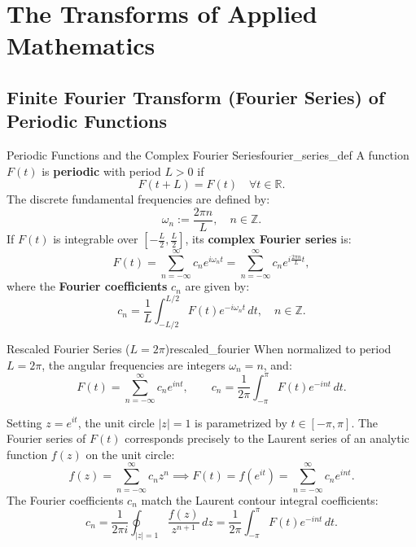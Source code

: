\chapter{The Transforms of Applied Mathematics}

\section{Finite Fourier Transform (Fourier Series) of Periodic Functions}

\begin{definition}{Periodic Functions and the Complex Fourier Series}{fourier_series_def}
A function $F(t)$ is \textbf{periodic} with period $L > 0$ if
\begin{equation}
F(t + L) = F(t) \quad \forall t \in \mathbb{R}.
\end{equation}
The discrete fundamental frequencies are defined by:
\begin{equation}
\omega_n := \frac{2\pi n}{L}, \quad n \in \mathbb{Z}.
\end{equation}
If $F(t)$ is integrable over $\left[-\frac{L}{2}, \frac{L}{2}\right]$, its \textbf{complex Fourier series} is:
\begin{equation}
F(t) = \sum_{n=-\infty}^\infty c_n e^{i \omega_n t} = \sum_{n=-\infty}^\infty c_n e^{i \frac{2\pi n}{L} t},
\end{equation}
where the \textbf{Fourier coefficients} $c_n$ are given by:
\begin{equation}
c_n = \frac{1}{L} \int_{-L/2}^{L/2} F(t) e^{-i \omega_n t}\, dt, \quad n \in \mathbb{Z}.
\end{equation}
\end{definition}

\begin{proposition}{Rescaled Fourier Series ($L = 2\pi$)}{rescaled_fourier}
When normalized to period $L = 2\pi$, the angular frequencies are integers $\omega_n = n$, and:
\begin{equation}
F(t) = \sum_{n=-\infty}^\infty c_n e^{int}, \qquad c_n = \frac{1}{2\pi} \int_{-\pi}^\pi F(t) e^{-int}\, dt.
\end{equation}
\end{proposition}

\begin{remark}
Setting $z = e^{it}$, the unit circle $|z| = 1$ is parametrized by $t \in [-\pi, \pi]$. The Fourier series of $F(t)$ corresponds precisely to the Laurent series of an analytic function $f(z)$ on the unit circle:
\begin{equation}
f(z) = \sum_{n=-\infty}^\infty c_n z^n \implies F(t) = f(e^{it}) = \sum_{n=-\infty}^\infty c_n e^{int}.
\end{equation}
The Fourier coefficients $c_n$ match the Laurent contour integral coefficients:
\begin{equation}
c_n = \frac{1}{2\pi i} \oint_{|z|=1} \frac{f(z)}{z^{n+1}}\, dz = \frac{1}{2\pi} \int_{-\pi}^\pi F(t) e^{-int}\, dt.
\end{equation}
\end{remark}

